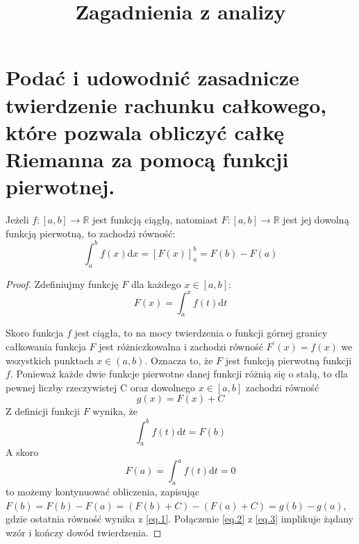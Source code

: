 \documentclass{article}
\title{Zagadnienia z analizy}
\theoremstyle{definition}
\theoremstyle{case}
\begin{document}
\makeatletter
{}
\makeatother

\begin{titlepage}
	\vspace*{\fill}
	\begin{center}
		\makeatletter
		\LARGE
		\@title
		\makeatother
	\end{center}
	\vspace*{\fill}
	\tableofcontents
\end{titlepage}

\newpage

\setcounter{page}{1}

\setcounter{section}{63}

\section{Podać i udowodnić zasadnicze twierdzenie rachunku całkowego,
które pozwala obliczyć całkę Riemanna za pomocą funkcji pierwotnej.}

Jeżeli ${f \colon [a,b] \to \mathbb{R}}$ jest funkcją ciągłą, natomiast ${F \colon [a,b] \to \mathbb{R}}$
jest jej dowolną funkcją pierwotną, to zachodzi równość:
\begin{equation*}
	\int_a^b f(x) \mathrm{d}x = [ F(x) ]_a^b = F(b) - F(a)
\end{equation*}

\begin{proof}
	Zdefiniujmy funkcję $F$ dla każdego ${x \in [a,b]}$:
	\begin{equation*}
		F(x) = \textstyle \int_a^x f(t) \mathrm{d}t
	\end{equation*}

	Skoro funkcja $f$ jest ciągła, to na mocy twierdzenia o funkcji
	górnej granicy całkowania funkcja $F$ jest różniczkowalna
	i zachodzi równość ${F^\prime(x)=f(x)}$ we wszystkich punktach ${x \in (a,b)}$.
	Oznacza to, że $F$ jest funkcją pierwotną funkcji $f$.
	Ponieważ każde dwie funkcje pierwotne danej funkcji różnią się o stałą,
	to dla pewnej liczby rzeczywistej C oraz dowolnego ${x \in [a,b]}$
	zachodzi równość
	\begin{equation}
		\label{eq.1}
		g(x)=F(x)+C
	\end{equation}
	Z definicji funkcji $F$ wynika, że
	\begin{equation}
		\label{eq.2}
		\textstyle \int_a^b f(t) \mathrm{d}t = F(b)
	\end{equation}
	A skoro
	\begin{equation}
		\label{eq.3}
		F(a) = \textstyle \int_a^a f(t) \mathrm{d}t=0
	\end{equation}
	to możemy kontynuować obliczenia, zapisując
	${F(b)=F(b)-F(a)=(F(b)+C)-(F(a)+C)=g(b)-g(a)}$,
	gdzie ostatnia równość wynika z \eqref{eq.1}. Połączenie \eqref{eq.2} z \eqref{eq.3} implikuje żądany wzór i kończy dowód twierdzenia.
\end{proof}
\end{document}
